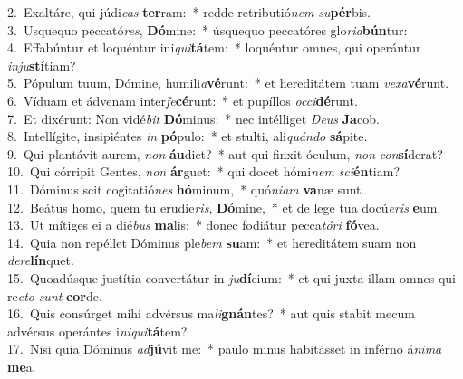 {2.~}Exaltáre, qui júdi\textit{cas} \textbf{ter}ram:~* redde retributió\textit{nem} \textit{su}\textbf{pér}bis.\\
{3.~}Usquequo peccató\textit{res}, \textbf{Dó}mine:~* úsquequo peccatóres glo\textit{ri}\textit{a}\textbf{bún}tur:\\
{4.~}Effabúntur et loquéntur ini\textit{qui}\textbf{tá}tem:~* loquéntur omnes, qui operántur \textit{in}\textit{ju}\textbf{stí}tiam?\\
{5.~}Pópulum tuum, Dómine, humili\textit{a}\textbf{vé}runt:~* et hereditátem tuam \textit{ve}\textit{xa}\textbf{vé}runt.\\
{6.~}Víduam et ádvenam inter\textit{fe}\textbf{cé}runt:~* et pupíllos \textit{oc}\textit{ci}\textbf{dé}runt.\\
{7.~}Et dixérunt: Non vidé\textit{bit} \textbf{Dó}minus:~* nec intélliget \textit{De}\textit{us} \textbf{Ja}cob.\\
{8.~}Intellígite, insipiéntes \textit{in} \textbf{pó}pulo:~* et stulti, ali\textit{quán}\textit{do} \textbf{sá}pite.\\
{9.~}Qui plantávit aurem, \textit{non} \textbf{áu}diet?~* aut qui finxit óculum, \textit{non} \textit{con}\textbf{sí}derat?\\
{10.~}Qui córripit Gentes, \textit{non} \textbf{ár}guet:~* qui docet hómi\textit{nem} \textit{sci}\textbf{én}tiam?\\
{11.~}Dóminus scit cogitatió\textit{nes} \textbf{hó}minum,~* quó\textit{ni}\textit{am} \textbf{va}næ sunt.\\
{12.~}Beátus homo, quem tu erudíe\textit{ris}, \textbf{Dó}mine,~* et de lege tua docú\textit{e}\textit{ris} \textbf{e}um.\\
{13.~}Ut mítiges ei a dié\textit{bus} \textbf{ma}lis:~* donec fodiátur pecca\textit{tó}\textit{ri} \textbf{fó}vea.\\
{14.~}Quia non repéllet Dóminus ple\textit{bem} \textbf{su}am:~* et hereditátem suam non \textit{de}\textit{re}\textbf{lín}quet.\\
{15.~}Quoadúsque justítia convertátur in \textit{ju}\textbf{dí}cium:~* et qui juxta illam omnes qui re\textit{cto} \textit{sunt} \textbf{cor}de.\\
{16.~}Quis consúrget mihi advérsus ma\textit{li}\textbf{gnán}tes?~* aut quis stabit mecum advérsus operántes i\textit{ni}\textit{qui}\textbf{tá}tem?\\
{17.~}Nisi quia Dóminus \textit{ad}\textbf{jú}vit me:~* paulo minus habitásset in inférno á\textit{ni}\textit{ma} \textbf{me}a.\\
